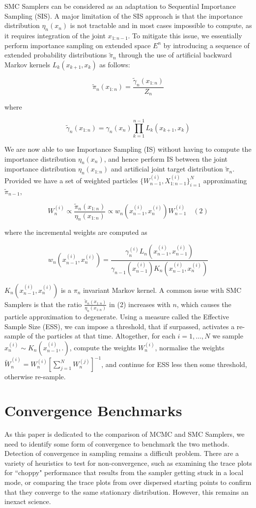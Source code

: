 \documentclass[12pt]{elsarticle}
\begin{document}
SMC Samplers can be considered as an adaptation to Sequential Importance Sampling (SIS). A major limitation of the SIS approach is that the importance distribution $\eta_n(x_n)$ is not tractable and in most cases impossible to compute, as it requires integration of the joint $x_{1:n-1}$. To mitigate this issue,  we essentially perform importance sampling on extended space $E^n$ by introducing a sequence of extended probability distributions $\tilde{\pi}_n$ through the use of artificial backward Markov kernels $L_k(x_{k+1},x_k)$ as follows:

\[
\tilde{\pi}_n(x_{1:n}) = \frac{\tilde{\gamma}_n(x_{1:n})}{Z_n}
\]

where 

\[
\tilde{\gamma}_n(x_{1:n}) = \gamma_n(x_n) \prod_{k=1}^{n-1} L_k(x_{k+1},x_k)
\]

We are now able to use Importance Sampling (IS) without having to compute the importance distribution $\eta_n(x_n)$, and hence perform IS between the joint importance distribution $\eta_n(x_{1:n})$ and artificial joint target distribution $\tilde{\pi}_n$. Provided we have a set of weighted particles $\{W_{n-1}^{(i)}, X_{1:n-1}^{(i)}\}_{i=1}^N$ approximating $\tilde{\pi}_{n-1}$,

\[
W_n^{(i)} \propto \frac{\tilde{\pi}_n(x_{1:n})}{\eta_n(x_{1:n})} \propto w_n(x_{n-1}^{(i)}, x_n^{(i)})W_{n-1}^{(i)} \quad (2)
\]

where the incremental weights are computed as

\[
w_n(x_{n-1}^{(i)}, x_n^{(i)}) = \frac{\gamma_n^{(i)}L_{n}(x_{n-1}^{(i)}, x_{n-1}^{(i)})}{\gamma_{n-1}(x_{n-1}^{(i)}) K_n(x_{n-1}^{(i)}, x_n^{(i)})}
\]

$K_n(x_{n-1}^{(i)}, x_n^{(i)})$ is a $\pi_n$ invariant Markov kernel. A common issue with SMC Samplers is that the ratio $\frac{\tilde{\pi}_n(x_{1:n})}{\eta_n(x_{1:n})}$ in (2) increases with $n$, which causes the particle approximation to degenerate. Using a measure called the Effective Sample Size (ESS), we can impose a threshold, that if surpassed, activates a re-sample of the particles at that time. Altogether, for each $i = 1, \dots, N$ we sample $x_n^{(i)} \sim K_n(x_{n-1}^{(i)}, .)$, compute the weights $W_n^{(i)}$, normalise the weights $\tilde{W}_n^{(i)} = W_n^{(i)}[\sum_{j=1}^N W_n^{(j)}]^{-1}$, and continue for ESS less then some threshold, otherwise re-sample.

\section*{Convergence Benchmarks}
As this paper is dedicated to the comparison of MCMC and SMC Samplers, we need to identify some form of convergence to benchmark the two methods. Detection of convergence in sampling remains a difficult problem.  There are a variety of heuristics to test for non-convergence, such as examining the trace plots for ``choppy" performance that results from the sampler getting stuck in a local mode, or comparing the trace plots from over dispersed starting points to confirm that they converge to the same stationary distribution. However, this remains an inexact science.\\
\end{document}
